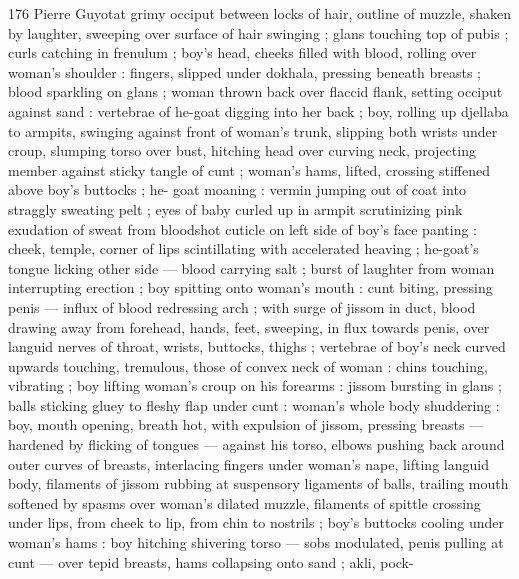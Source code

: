 176 Pierre Guyotat
grimy occiput between locks of hair, outline of muzzle, shaken by
laughter, sweeping over surface of hair swinging ; glans touching top
of pubis ; curls catching in frenulum ; boy's head, cheeks filled with
blood, rolling over woman's shoulder : fingers, slipped under
dokhala, pressing beneath breasts ; blood sparkling on glans ;
woman thrown back over flaccid flank, setting occiput against sand :
vertebrae of he-goat digging into her back ; boy, rolling up djellaba
to armpits, swinging against front of woman's trunk, slipping both
wrists under croup, slumping torso over bust, hitching head over
curving neck, projecting member against sticky tangle of cunt ;
woman's hams, lifted, crossing stiffened above boy's buttocks ; he-
goat moaning : vermin jumping out of coat into straggly sweating
pelt ; eyes of baby curled up in armpit scrutinizing pink exudation of
sweat from bloodshot cuticle on left side of boy's face panting :
cheek, temple, corner of lips scintillating with accelerated heaving ;
he-goat's tongue licking other side — blood carrying salt ; burst of
laughter from woman interrupting erection ; boy spitting onto
woman's mouth : cunt biting, pressing penis — influx of blood
redressing arch ; with surge of jissom in duct, blood drawing away
from forehead, hands, feet, sweeping, in flux towards penis, over
languid nerves of throat, wrists, buttocks, thighs ; vertebrae of boy's
neck curved upwards touching, tremulous, those of convex neck of
woman : chins touching, vibrating ; boy lifting woman's croup on his
forearms : jissom bursting in glans ; balls sticking gluey to fleshy flap
under cunt : woman's whole body shuddering : boy, mouth opening,
breath hot, with expulsion of jissom, pressing breasts — hardened
by flicking of tongues — against his torso, elbows pushing back
around outer curves of breasts, interlacing fingers under woman's
nape, lifting languid body, filaments of jissom rubbing at suspensory
ligaments of balls, trailing mouth softened by spasms over woman's
dilated muzzle, filaments of spittle crossing under lips, from cheek to
lip, from chin to nostrils ; boy's buttocks cooling under woman's
hams : boy hitching shivering torso — sobs modulated, penis pulling
at cunt — over tepid breasts, hams collapsing onto sand ; akli, pock-

